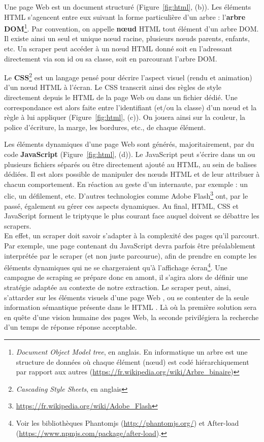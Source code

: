 \documentclass[symmetric,justified,marginals=raggedouter]{tufte-book}
\begin{document}
Une page Web est un document structuré (Figure~\ref{fig:html}, (b)). Les éléments HTML s'agencent entre eux suivant la forme particulière d'un arbre : l'\textbf{arbre DOM}\footnote{\RaggedOuter \textit{Document Object Model tree}, en anglais. En informatique un arbre est une structure de données où chaque élément (nœud) est codé hiérarchiquement par rapport aux autres (\url{https://fr.wikipedia.org/wiki/Arbre_binaire})}. Par convention, on appelle \textbf{nœud} HTML tout élément d'un arbre DOM. Il existe ainsi un seul et unique nœud racine, plusieurs nœuds parents, enfants, etc. Un scraper peut accéder à un nœud HTML donné soit en l'adressant directement via son id ou sa classe, soit en parcourant l'arbre DOM.  

Le \textbf{CSS}\footnote{\RaggedOuter \textit{Cascading Style Sheets}, en anglais} est un langage pensé pour décrire l'aspect visuel (rendu et animation) d'un nœud HTML à l'écran. Le CSS transcrit ainsi des règles de style directement depuis le HTML de la page Web ou dans un fichier dédié. Une correspondance est alors faite entre l'identifiant (et/ou la classe) d'un nœud et la règle à lui appliquer (Figure~\ref{fig:html}, (c)). On jouera ainsi sur la couleur, la police d'écriture, la marge, les bordures, etc., de chaque élément.  

Les éléments dynamiques d'une page Web sont générés, majoritairement, par du code \textbf{JavaScript} (Figure~\ref{fig:html}, (d)). Le JavaScript peut s'écrire dans un ou plusieurs fichiers séparés ou être directement ajouté au HTML, au sein de balises dédiées. Il est alors possible de manipuler des nœuds HTML et de leur attribuer à chacun comportement. En réaction au geste d'un internaute, par exemple : un clic, un défilement, etc. D'autres technologies comme Adobe Flash\footnote{\RaggedOuter \url{https://fr.wikipedia.org/wiki/Adobe_Flash}} ont, par le passé, également su gérer ces aspects dynamiques. Au final, HTML, CSS et JavaScript forment le triptyque le plus courant face auquel doivent se débattre les scrapers.\\

\noindent En effet, un scraper doit savoir s'adapter à la complexité des pages qu'il parcourt. Par exemple, une page contenant du JavaScript devra parfois être préalablement interprétée par le scraper (et non juste parcourue), afin de prendre en compte les éléments dynamiques qui ne se chargeraient qu'à l'affichage écran\footnote{\RaggedOuter Voir les bibliothèques Phantomjs (\url{http://phantomjs.org/}) et After-load (\url{https://www.npmjs.com/package/after-load}).}. Une campagne de scraping se prépare donc en amont, il s'agira alors de définir une stratégie adaptée au contexte de notre extraction. Le scraper peut, ainsi, s'attarder sur les éléments visuels d'une page Web \citep{cai_extracting_2003}, ou se contenter de la seule information sémantique présente dans le HTML \citep{jatowt_detecting_2007}. Là où la première solution sera en quête d'une vision humaine des pages Web, la seconde privilégiera la recherche d'un temps de réponse réponse acceptable. 
\end{document}
